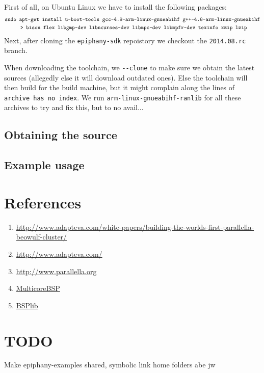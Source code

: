 \documentclass{article}
\renewcommand{\(}{\left(}
\renewcommand{\)}{\right)}
\begin{document}
First of all, on Ubuntu Linux we have to install the following packages:
\begin{align*} 
    &\texttt{sudo apt-get install u-boot-tools gcc-4.8-arm-linux-gnueabihf g++-4.8-arm-linux-gnueabihf} \\
    &\texttt{\hspace{1 cm}> bison flex libgmp-dev libncurses-dev libmpc-dev libmpfr-dev texinfo xzip lzip}
\end{align*}
Next, after cloning the \verb+epiphany-sdk+ repoistory we checkout the \texttt{2014.08.rc} branch.

When downloading the toolchain, we \verb+--clone+ to make sure we obtain the latest sources (allegedly else it will download outdated ones). Else the toolchain will then build for the build machine, but it might complain along the lines of \texttt{archive has no index}. We run \texttt{arm-linux-gnueabihf-ranlib} for all these archives to try and fix this, but to no avail...


\subsection{Obtaining the source}

\subsection{Example usage}

\section{References}

\begin{enumerate}
    \item \url{http://www.adapteva.com/white-papers/building-the-worlds-first-parallella-beowulf-cluster/}
    \item \url{http://www.adapteva.com/}
    \item \url{http://www.parallella.org}
    \item \url{MulticoreBSP}
    \item \url{BSPlib}
\end{enumerate}

\section{TODO}

Make epiphany-examples shared, symbolic link home folders abe jw
\end{document}
